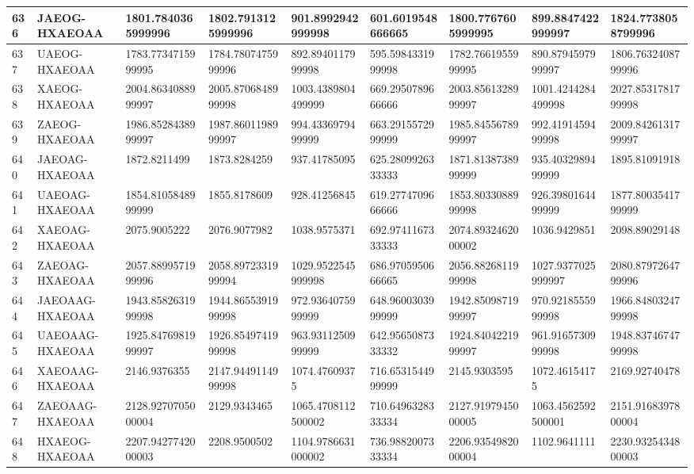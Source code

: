 {\begin{longtable}{|l|l|l|l|l|l|l|l|l|}
        636 & JAEOG-HXAEOAA & 1801.7840365999996 & 1802.7913125999996 & 901.8992942999998 & 601.6019548666665 & 1800.7767605999995 & 899.8847422999997 & 1824.7738058799996 \\ \hline
        637 & UAEOG-HXAEOAA & 1783.7734715999995 & 1784.7807475999996 & 892.8940117999998 & 595.5984331999998 & 1782.7661955999995 & 890.8794597999997 & 1806.7632408799996 \\ \hline
        638 & XAEOG-HXAEOAA & 2004.8634088999997 & 2005.8706848999998 & 1003.4389804499999 & 669.2950789666666 & 2003.8561328999997 & 1001.4244284499998 & 2027.8531781799998 \\ \hline
        639 & ZAEOG-HXAEOAA & 1986.8528438999997 & 1987.8601198999997 & 994.4336979499999 & 663.2915572999999 & 1985.8455678999997 & 992.4191459499998 & 2009.8426131799997 \\ \hline
        640 & JAEOAG-HXAEOAA & 1872.8211499 & 1873.8284259 & 937.41785095 & 625.2809926333333 & 1871.8138738999999 & 935.4032989499999 & 1895.81091918 \\ \hline
        641 & UAEOAG-HXAEOAA & 1854.8105848999999 & 1855.8178609 & 928.41256845 & 619.2774709666666 & 1853.8033088999998 & 926.3980164499999 & 1877.8003541799999 \\ \hline
        642 & XAEOAG-HXAEOAA & 2075.9005222 & 2076.9077982 & 1038.9575371 & 692.9741167333333 & 2074.8932462000002 & 1036.9429851 & 2098.89029148 \\ \hline
        643 & ZAEOAG-HXAEOAA & 2057.8899571999996 & 2058.8972331999994 & 1029.9522545999998 & 686.9705950666665 & 2056.8826811999998 & 1027.9377025999997 & 2080.8797264799996 \\ \hline
        644 & JAEOAAG-HXAEOAA & 1943.8582631999998 & 1944.8655391999998 & 972.9364075999999 & 648.9600303999999 & 1942.8509871999997 & 970.9218555999998 & 1966.8480324799998 \\ \hline
        645 & UAEOAAG-HXAEOAA & 1925.8476981999997 & 1926.8549741999998 & 963.9311250999999 & 642.9565087333332 & 1924.8404221999997 & 961.9165730999998 & 1948.8374674799998 \\ \hline
        646 & XAEOAAG-HXAEOAA & 2146.9376355 & 2147.9449114999998 & 1074.47609375 & 716.6531544999999 & 2145.9303595 & 1072.46154175 & 2169.92740478 \\ \hline
        647 & ZAEOAAG-HXAEOAA & 2128.9270705000004 & 2129.9343465 & 1065.4708112500002 & 710.6496328333334 & 2127.9197945000005 & 1063.4562592500001 & 2151.9168397800004 \\ \hline
        648 & HXAEOG-HXAEOAA & 2207.9427742000003 & 2208.9500502 & 1104.9786631000002 & 736.9882007333334 & 2206.9354982000004 & 1102.9641111 & 2230.9325434800003 \\ \hline

\end{longtable}}
